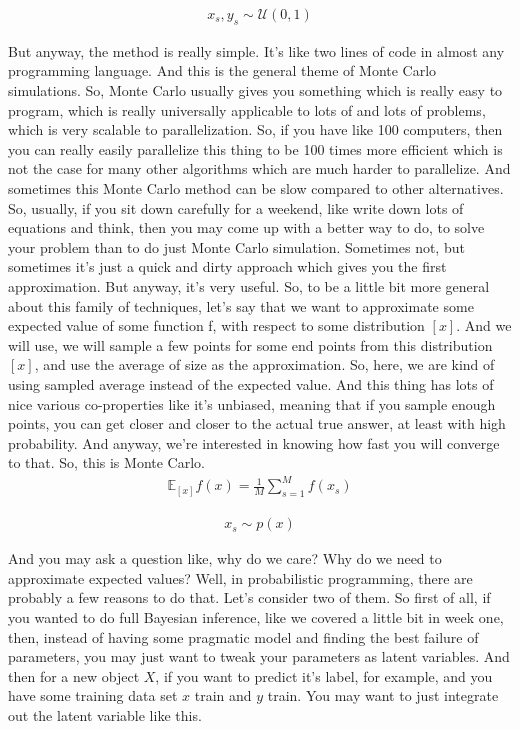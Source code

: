 \documentclass[11pt, oneside, reqno]{amsart}
\numberwithin{equation}{section}
\theoremstyle{plain}%
\theoremstyle{definition}
\theoremstyle{remark}
\newcommand{\E}{\mathbb{E}}
\begin{document}
\begin{align*}
	x_s,y_s\sim \mathcal{U}(0,1)
\end{align*}


But anyway, the method is really simple. It's like two lines of code in almost any programming language. And this is the general theme of Monte Carlo simulations. So, Monte Carlo usually gives you something which is really easy to program, which is really universally applicable to lots of and lots of problems, which is very scalable to parallelization. So, if you have like 100 computers, then you can really easily parallelize this thing to be 100 times more efficient which is not the case for many other algorithms which are much harder to parallelize. And sometimes this Monte Carlo method can be slow compared to other alternatives. So, usually, if you sit down carefully for a weekend, like write down lots of equations and think, then you may come up with a better way to do, to solve your problem than to do just Monte Carlo simulation. Sometimes not, but sometimes it's just a quick and dirty approach which gives you the first approximation. But anyway, it's very useful. So, to be a little bit more general about this family of techniques, let's say that we want to approximate some expected value of some function f, with respect to some distribution $[x]$. And we will use, we will sample a few points for some end points from this distribution $[x]$, and use the average of size as the approximation. So, here, we are kind of using sampled average instead of the expected value. And this thing has lots of nice various co-properties like it's unbiased, meaning that if you sample enough points, you can get closer and closer to the actual true answer, at least with high probability. And anyway, we're interested in knowing how fast you will converge to that. So, this is Monte Carlo.
\begin{align*}
	\E_{[x]}f(x)=\frac{1}{M}\sum^M_{s=1}f(x_s)
\end{align*}

\begin{align*}
	x_s\sim p(x)
\end{align*}

 And you may ask a question like, why do we care? Why do we need to approximate expected values? Well, in probabilistic  programming, there are probably a few reasons to do that. Let's consider two of them. So first of all, if you wanted to do full Bayesian inference, like we covered a little bit in week one, then, instead of having some pragmatic model and finding the best failure of parameters, you may just want to tweak your parameters as latent variables. And then for a new object $X$, if you want to predict it's label, for example, and you have some training data set $x$ train and $y$ train. You may want to just integrate out the latent variable like this.
 
\end{document}
